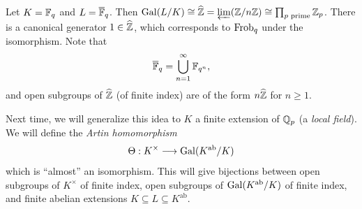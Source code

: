 \begin{example}
  Let $K = \mathbb{F}_q$ and $L = \overline{\mathbb{F}}_q$.
  Then $\operatorname{Gal}(L / K) \cong \widehat{\mathbb{Z}} = \varprojlim (\mathbb{Z} / n\mathbb{Z}) \cong \prod_{p \text{ prime}} \mathbb{Z}_p$.
  There is a canonical generator
  $1 \in \widehat{\mathbb{Z}}$, which corresponds to
  $\operatorname{Frob}_q$ under the isomorphism. Note that
  \[
    \overline{\mathbb{F}}_q = \bigcup_{n = 1}^\infty \mathbb{F}_{q^n},
  \]
  and open subgroups of $\widehat{\mathbb{Z}}$ (of
  finite index) are of the form
  $n\widehat{\mathbb{Z}}$ for $n \ge 1$.
\end{example}

\begin{remark}
  Next time, we will generalize this
  idea to $K$
  a finite extension of $\mathbb{Q}_p$ (a \emph{local field}).
  We will define the
  \emph{Artin homomorphism}
  \[
    \Theta : K^\times \longrightarrow \operatorname{Gal}(K^{\mathrm{ab}} / K)
  \]
  which is ``almost'' an isomorphism.
  This will give bijections between
  open subgroups of $K^\times$ of finite index,
  open subgroups of $\operatorname{Gal}(K^{\mathrm{ab}} / K)$
  of finite index, and finite abelian extensions
  $K \subseteq L \subseteq K^{\mathrm{ab}}$.
\end{remark}
